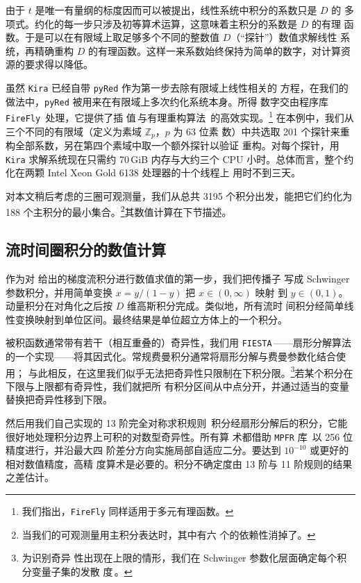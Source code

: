 由于 $t$ 是唯一有量纲的标度因而可以被提出，线性系统中积分的系数只是 $D$ 的
多项式。约化的每一步只涉及初等算术运算，这意味着主积分的系数是 $D$ 的有理
函数。于是可以在有限域上取足够多个不同的整数值 $D$（``探针''）数值求解线性
系统，再精确重构 $D$ 的有理函数。这样一来系数始终保持为简单的数字，对计算资
源的要求得以降低。

虽然 \texttt{Kira} 已经自带 \texttt{pyRed} 作为第一步去除有限域上线性相关的
方程，在我们的做法中，\texttt{pyRed} 被用来在有限域上多次约化系统本身。所得
数字交由程序库 \texttt{FireFly}\,\cite{Klappert:2019emp} 处理，它提供了插
值\,\cite{Zippel:1990,Cuyt:2011}与有理重构算法\,\cite{Wang:1981,Monagan:2004}
的高效实现。\footnote{我们指出，\texttt{FireFly} 同样适用于多元有理函数。}
在本例中，我们从三个不同的有限域（定义为素域 $\mathbb{Z}_p$，$p$ 为 63 位素
数）中共选取 201 个探针来重构全部系数，另在第四个素域中取一个额外探针以验证
重构。对每个探针，用 \texttt{Kira} 求解系统现在只需约 70\,GiB 内存与大约三个
CPU 小时。总体而言，整个约化在两颗 Intel Xeon Gold 6138 处理器的十个线程上
用时不到三天。

对本文稍后考虑的三圈可观测量，我们从总共 3195 个积分出发，能把它们约化为
188 个主积分的最小集合。\footnote{当我们的可观测量用主积分表达时，其中有六
	个的依赖性消掉了。}其数值计算在下节描述。

\subsection{流时间圈积分的数值计算}

作为对  给出的梯度流积分进行数值求值的第一步，我们把传播子
写成 Schwinger 参数积分，并用简单变换 $x=y/(1-y)$ 把 $x\in(0,\infty)$ 映射
到 $y\in(0,1)$。动量积分在对角化之后按 $D$ 维高斯积分完成。类似地，所有流时
间积分经简单线性变换映射到单位区间。最终结果是单位超立方体上的一个积分。

被积函数通常带有若干（相互重叠的）奇异性，我们用
\texttt{FIESTA}\,\cite{Smirnov:2013eza}——扇形分解算法\,\cite{Binoth:2003ak}
的一个实现——将其因式化。常规费曼积分通常将扇形分解与费曼参数化结合使用；
与此相反，在这里我们似乎无法把奇异性只限制在下积分限。\footnote{为识别奇异
  性出现在上限的情形，我们在 Schwinger 参数化层面确定每个积分变量子集的发散
  度\,\cite{Panzer:2014gra}。}若某个积分在下限与上限都有奇异性，我们就把所
有积分区间从中点分开，并通过适当的变量替换把奇异性移到下限。

然后用我们自己实现的 13 阶完全对称求积规则\,\cite{GenzMalik,Harlander:2016vzb}
积分经扇形分解后的积分，它能很好地处理积分边界上可积的对数型奇异性。所有算
术都借助 \texttt{MPFR} 库\,\cite{Fousse:2007} 以 256 位精度进行，并沿最大四
阶差分方向实施局部自适应二分。要达到 $10^{-10}$ 或更好的相对数值精度，高精
度算术是必要的。积分不确定度由 13 阶与 11 阶规则的结果之差估计。


